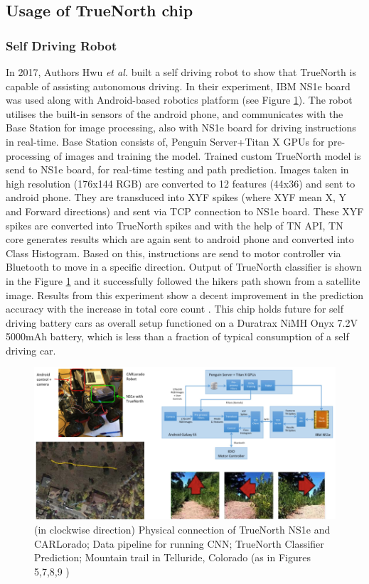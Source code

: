 \documentclass[11pt,twoside]{article}
\begin{document}
\subsection{Usage of TrueNorth chip}
\subsubsection{Self Driving Robot}
In 2017, Authors Hwu \textit{et al.} \cite{hwu2017self} built a self driving robot to show that TrueNorth is capable of assisting autonomous driving. In their experiment, IBM NS1e board was used along with Android-based robotics platform (see Figure \ref{fig:selfrobo}).  The robot utilises the built-in sensors of the android phone, and communicates with the Base Station for image processing, also with NS1e board for driving instructions in real-time. Base Station consists of, Penguin Server+Titan X GPUs for pre-processing of images and training the model. Trained custom TrueNorth model is send to NS1e board, for real-time testing and path prediction. Images taken in high resolution (176x144 RGB) are converted to 12 features (44x36) and sent to android phone. They are transduced into XYF spikes (where XYF mean X, Y and Forward directions) and sent via TCP connection to NS1e board. These XYF spikes are converted into TrueNorth spikes and with the help of TN API, TN core generates results which are again sent to android phone and converted into Class Histogram. Based on this, instructions are send to motor controller via Bluetooth to move in a specific direction. Output of TrueNorth classifier is shown in the Figure \ref{fig:selfrobo} and it successfully followed the hikers path shown from a satellite image. Results from this experiment show a decent improvement in the prediction accuracy with the increase in total core count \cite{hwu2017self}. This chip holds future for self driving battery cars as overall setup functioned on a Duratrax NiMH Onyx 7.2V 5000mAh battery, which is less than a fraction of typical consumption of a self driving car\cite{9007413}.


\begin{figure}
	\centering
	\includegraphics[width=0.8\linewidth]{Report-LateX-Template/fig/selfdrivingrobot.png}
	\caption{(in clockwise direction) Physical connection of TrueNorth NS1e and CARLorado; Data pipeline for running CNN; TrueNorth Classifier Prediction; Mountain trail in Telluride, Colorado (as in Figures 5,7,8,9 \cite{hwu2017self})}
	\label{fig:selfrobo}
\end{figure}
\end{document}
